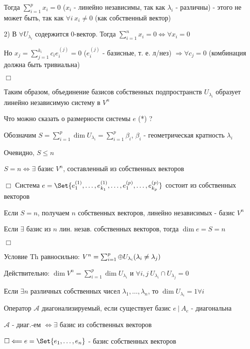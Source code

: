 \documentclass[12pt]{article}
\begin{document}
    Тогда $\sum_{i=1}^p x_i = 0$ ($x_i$ - линейно независимы, так как $\lambda_i$ - различны) - этого не может быть, так как $\forall i \ x_i \neq 0$ (как собственный вектор)

    2) В $\forall U_{\lambda_i}$ содержится $0$-вектор. Тогда $\sum_{i=1}^n x_i = 0 \Longleftrightarrow \forall x_i = 0$

    Но $x_j = \sum_{j=1}^{k_i} c_i e^{(j)}_i = 0$ ($e^{(j)}_i$ - базисные, т. е. л/нез) $\Longrightarrow \forall c_j = 0$ (комбинация должна быть тривиальна)

    $\Box$

    \Nota Таким образом, объединение базисов собственных подпространств $U_{\lambda_i}$ образует линейно независимую систему в $V^n$

    Что можно сказать о размерности системы $e$ (*) ?

    Обозначим $S = \sum_{i=1}^p \dim U_{\lambda_i} = \sum_{i=1}^p \beta_i$, $\beta_i$ - геометрическая кратность $\lambda_i$

    Очевидно, $S \leq n$

    \Th $S = n \Longleftrightarrow \exists$ базис $V^n$, составленный из собственных векторов

    $\Box$ Система $e = \Set{e^{(1)}_1, \dots, e^{(1)}_{k_1}, \dots, e^{(p)}_1, \dots, e^{(p)}_{k_p}}$ состоит из собственных векторов

    Если $S = n$, получаем $n$ собственных векторов, линейно независимых - базис $V^n$

    Если $\exists$ базис из $n$ лин. незав. собственных векторов, тогда $\dim e = S = n$

    $\Box$

    \Nota Условие Th равносильно: $V^n = \sum_{i=1}^p \oplus U_{\lambda_i} (\lambda_i \neq \lambda_j)$

    Действительно: $\dim V^n = \sum_{i=1}^p \dim U_{\lambda_i}$ и $\forall i, j \ U_{\lambda_i} \cap U_{\lambda_j} = 0$

    \Ex Если $\exists n$ различных собственных чисел $\lambda_1, \dots, \lambda_n$, то $\dim U_{\lambda_i} = 1 \forall i$

    \Def Оператор $\mathcal{A}$ диагонализируемый, если существует базис $e \ | \ A_e$ - диагональна

    \hypertarget{diagonalizedmatrixtheorem}{}

    \Th $\mathcal{A}$ - диаг.-ем $\Longleftrightarrow \exists$ базис из собственных векторов

    $\Box \Longleftarrow e = \Set{e_1, \dots, e_n}$ - базис собственных векторов
\end{document}
